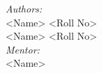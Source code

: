 \begin{titlepage}
\begin{center}
\large \emph{Authors:}\\
\large <Name> <Roll No>\\
\large <Name> <Roll No>\\

\vspace{0.1cm}
\large \emph{Mentor:} \\
\large <Name>



\end{center}
\end{titlepage}
